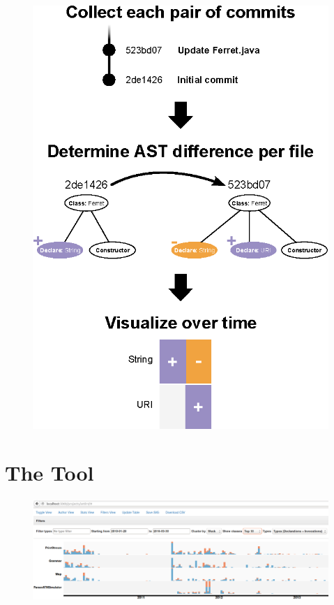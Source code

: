 \documentclass[conference]{IEEEtran}
\begin{document}
\begin{figure}[!h]
\centering
\includegraphics[width=\columnwidth]{context}
\caption{}
\label{fig:context}
\end{figure}

\section{The Tool}

\begin{figure}[!t]
\centering
\includegraphics[width=\textwidth]{Screenshot_antlr4}
\caption{}
\label{fig:main-view}
\end{figure}
\end{document}
